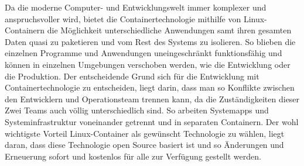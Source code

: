 
Da die moderne Computer- und Entwicklungswelt immer komplexer und anspruchsvoller wird, bietet die Containertechnologie mithilfe von Linux-Containern die Möglichkeit unterschiedliche Anwendungen samt ihren gesamten Daten quasi zu paketieren und vom Rest des Systems zu isolieren.  So blieben die einzelnen Programme und Anwendungen uneingeschränkt funktionsfähig und können in einzelnen Umgebungen verschoben werden, wie die Entwicklung oder die Produktion.
Der entscheidende Grund sich für die Entwicklung mit Containertechnologie zu entscheiden, liegt darin, dass man so Konflikte zwischen den Entwicklern und Operationsteam trennen kann, da die Zuständigkeiten dieser Zwei Teams auch völlig unterschiedlich sind. So arbeiten Systemapps und Systeminfrastruktur voneinander getrennt und in separaten Containern. Der wohl wichtigste Vorteil Linux-Container als gewünscht Technologie zu wählen, liegt daran, dass diese Technologie open Source basiert ist und so Änderungen und Erneuerung sofort und kostenlos für alle zur Verfügung gestellt werden.
